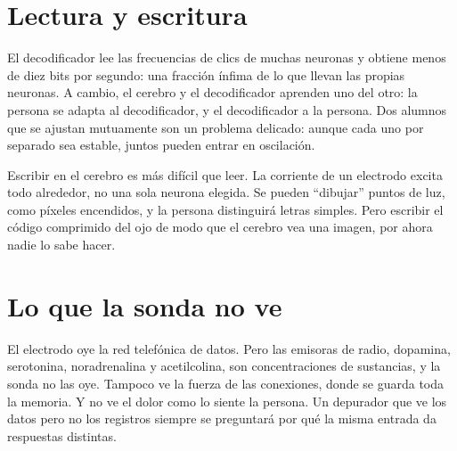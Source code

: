 \section*{Lectura y escritura}

El decodificador lee las frecuencias de clics de muchas neuronas y obtiene menos de diez bits por segundo: una fracción ínfima de lo que llevan las propias neuronas. A cambio, el cerebro y el decodificador aprenden uno del otro: la persona se adapta al decodificador, y el decodificador a la persona. Dos alumnos que se ajustan mutuamente son un problema delicado: aunque cada uno por separado sea estable, juntos pueden entrar en oscilación.

Escribir en el cerebro es más difícil que leer. La corriente de un electrodo excita todo alrededor, no una sola neurona elegida. Se pueden “dibujar” puntos de luz, como píxeles encendidos, y la persona distinguirá letras simples. Pero escribir el código comprimido del ojo de modo que el cerebro vea una imagen, por ahora nadie lo sabe hacer.

\section*{Lo que la sonda no ve}

El electrodo oye la red telefónica de datos. Pero las emisoras de radio, dopamina, serotonina, noradrenalina y acetilcolina, son concentraciones de sustancias, y la sonda no las oye. Tampoco ve la fuerza de las conexiones, donde se guarda toda la memoria. Y no ve el dolor como lo siente la persona. Un depurador que ve los datos pero no los registros siempre se preguntará por qué la misma entrada da respuestas distintas.


